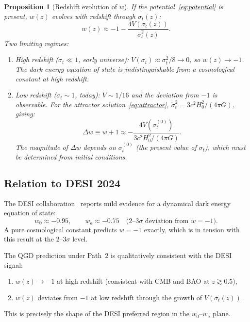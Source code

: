 \documentclass[11pt,a4paper]{article}
\theoremstyle{plain}
\newtheorem{proposition}[theorem]{Proposition}
\theoremstyle{definition}
\theoremstyle{remark}
\newcommand{\dotv}{\dot\sigma_t}
\begin{document}
\begin{proposition}[Redshift evolution of $w$]
\label{prop:wz}
If the potential~\eqref{eq:potential} is present, $w(z)$ evolves with
redshift through $\sigma_t(z)$:
\begin{equation}
  w(z) \approx -1 - \frac{4V(\sigma_t(z))}{\dotv^2(z)}.
  \label{eq:wz}
\end{equation}
Two limiting regimes:
\begin{enumerate}
  \item[\rm(i)] High redshift ($\sigma_t \ll 1$, early universe):
    $V(\sigma_t) \approx \sigma_t^2/8 \to 0$, so $w(z) \to -1$.
    The dark energy equation of state is indistinguishable from
    a cosmological constant at high redshift.
  \item[\rm(ii)] Low redshift ($\sigma_t \sim 1$, today):
    $V \sim 1/16$ and the deviation from $-1$ is observable.
    For the attractor solution~\eqref{eq:attractor},
    $\dotv^2 = 3c^2 H_0^2/(4\pi G)$, giving:
    \begin{equation}
      \Delta w \equiv w + 1 \approx
      -\frac{4V(\sigma_t^{(0)})}{3c^2H_0^2/(4\pi G)}.
      \label{eq:deltaw}
    \end{equation}
    The magnitude of $\Delta w$ depends on $\sigma_t^{(0)}$ (the
    present value of $\sigma_t$), which must be determined from
    initial conditions.
\end{enumerate}
\end{proposition}

\subsection{Relation to DESI 2024}
\label{sec:desi}

The DESI collaboration~\cite{DESI2024} reports mild evidence for a
dynamical dark energy equation of state:
\begin{equation}
  w_0 \approx -0.95, \qquad w_a \approx -0.75 \quad
  \text{(2--3$\sigma$ deviation from } w=-1\text{)}.
\end{equation}
A pure cosmological constant predicts $w = -1$ exactly, which is in
tension with this result at the $2$--$3\sigma$ level.

The QGD prediction under Path~2 is qualitatively consistent with the
DESI signal:
\begin{enumerate}
  \item $w(z) \to -1$ at high redshift (consistent with CMB and BAO
    at $z \gtrsim 0.5$),
  \item $w(z)$ deviates from $-1$ at low redshift through the
    growth of $V(\sigma_t(z))$.
\end{enumerate}
This is precisely the shape of the DESI preferred region in the
$w_0$--$w_a$ plane.
\end{document}

